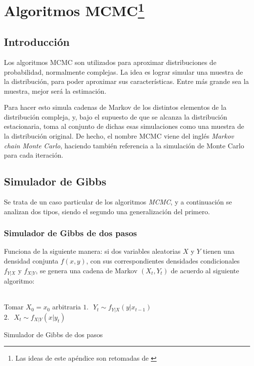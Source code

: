 \chapter[Algoritmos MCMC]{Algoritmos MCMC\footnote{Las ideas de este ap\'endice son retomadas de \cite{Robert_MCMC}} }\label{chap:MCMC}

\section {Introducci\'on}

Los algoritmos MCMC son utilizados para aproximar distribuciones de probabilidad, normalmente complejas. La idea es lograr simular una muestra de la distribuci\'on, para poder aproximar sus caracter\'isticas. Entre m\'as grande sea la muestra, mejor ser\'a la estimaci\'on.

Para hacer esto simula cadenas de Markov de los distintos elementos de la distribuci\'on compleja, y, bajo el supuesto de que se alcanza la distribuci\'on estacionaria, toma al conjunto de dichas esas simulaciones como una muestra de la distribuci\'on original. De hecho, el nombre MCMC viene del ingl\'es \textit{Markov chain Monte Carlo}, haciendo tambi\'en referencia a la simulaci\'on de Monte Carlo para cada iteraci\'on.

\section{Simulador de Gibbs}

Se trata de un caso particular de los algoritmos \textit{MCMC}, y a continuaci\'on se analizan dos tipos, siendo el segundo una generalizaci\'on del primero.

\subsection{Simulador de Gibbs de dos pasos}

Funciona de la siguiente manera: si dos variables aleatorias $X$ y $Y$ tienen una densidad conjunta $f(x,y)$, con sus correspondientes densidades condicionales $f_{Y|X}$ y $f_{X|Y}$, se genera una cadena de Markov $(X_t,Y_t)$ de acuerdo al siguiente algoritmo:
\\ \\
\begin{algorithm}[H]
 {Tomar $X_0 = x_0$ arbitraria \;
     {
        $1. \text{ } Y_t \sim f_{Y|X}(y|x_{t-1})\;$\\
        $2. \text{ } X_t \sim f_{X|Y}(x|y_{t})\;$
     }
 }
 \caption{Simulador de Gibbs de dos pasos}
\end{algorithm}
\BlankLine

